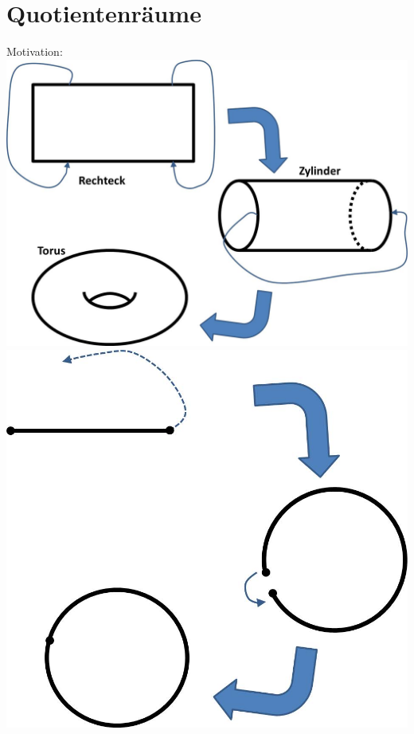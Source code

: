\documentclass[a4paper,11pt,notitlepage]{report}
\theoremstyle{definition}
\begin{document}
\section{Quotientenräume}
Motivation:\newline
\includegraphics[scale=0.6]{images/Identifizierung1.jpg}\newline
\includegraphics[scale=0.6]{images/Identifizierung2.jpg}\newline
\end{document}
